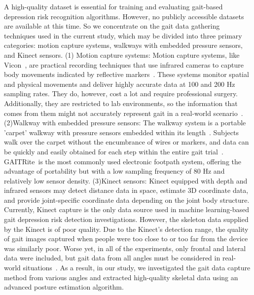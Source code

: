 \documentclass[10pt,twocolumn,letterpaper]{article}
\begin{document}
A high-quality dataset is essential for training and evaluating gait-based depression risk recognition algorithms.
However, no publicly accessible datasets are available at this time.
So we concentrate on the gait data gathering techniques used in the current study, which may be divided into three primary categories: motion capture systems, walkways with embedded pressure sensors, and Kinect sensors.
(1)
Motion capture systems: Motion capture systems, like Vicon~\cite{michalak2009embodiment}, are practical recording techniques that use infrared cameras to capture body movements indicated by reflective markers~\cite{bovi2011multiple}.
These systems monitor spatial and physical movements and deliver highly accurate data at 100 and 200 Hz sampling rates.
They do, however, cost a lot and require professional surgery.
Additionally, they are restricted to lab environments, so the information that comes from them might not accurately represent gait in a real-world scenario~\cite{cho2018evaluation}.
(2)Walkway with embedded pressure sensors:
The walkway system is a portable 'carpet' walkway with pressure sensors embedded within its length~\cite{webster2005validity,menz2004reliability,bilney2003concurrent}.
Subjects walk over the carpet without the encumbrance of wires or markers, and data can be quickly and easily obtained for each step within the entire gait trial~\cite{lemke2000spatiotemporal}.
GAITRite~\cite{gabel2015dual,brandler2012depressive}is the most commonly used electronic footpath system, offering the advantage of portability but with a low sampling frequency of 80 Hz and relatively low sensor density.
(3)Kinect sensors: Kinect equipped with depth and infrared sensors may detect distance data in space, estimate 3D coordinate data, and provide joint-specific coordinate data depending on the joint body structure.
Currently, Kinect capture is the only data source used in machine learning-based gait depression risk detection investigations.
However, the skeleton data supplied by the Kinect is of poor quality.
Due to the Kinect's detection range, the quality of gait images captured when people were too close to or too far from the device was similarly poor.
Worse yet, in all of the experiments, only frontal and lateral data were included, but gait data from all angles must be considered in real-world situations~\cite{shao2021multi}.
As a result, in our study, we investigated the gait data capture method from various angles and extracted high-quality skeletal data using an advanced posture estimation algorithm.
\end{document}

